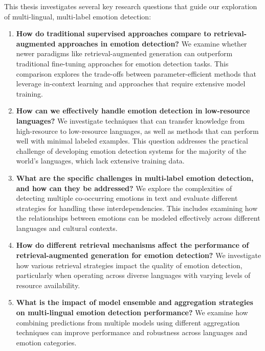 \documentclass[a4paper,12pt]{extarticle}
\begin{document}
This thesis investigates several key research questions that guide our exploration of multi-lingual, multi-label emotion detection:

\begin{enumerate}
\item \textbf{How do traditional supervised approaches compare to retrieval-augmented approaches in emotion detection?}
   We examine whether newer paradigms like retrieval-augmented generation can outperform traditional fine-tuning approaches for emotion detection tasks. This comparison explores the trade-offs between parameter-efficient methods that leverage in-context learning and approaches that require extensive model training.

\item \textbf{How can we effectively handle emotion detection in low-resource languages?}
   We investigate techniques that can transfer knowledge from high-resource to low-resource languages, as well as methods that can perform well with minimal labeled examples. This question addresses the practical challenge of developing emotion detection systems for the majority of the world's languages, which lack extensive training data.

\item \textbf{What are the specific challenges in multi-label emotion detection, and how can they be addressed?}
   We explore the complexities of detecting multiple co-occurring emotions in text and evaluate different strategies for handling these interdependencies. This includes examining how the relationships between emotions can be modeled effectively across different languages and cultural contexts.

\item \textbf{How do different retrieval mechanisms affect the performance of retrieval-augmented generation for emotion detection?}
   We investigate how various retrieval strategies impact the quality of emotion detection, particularly when operating across diverse languages with varying levels of resource availability.

\item \textbf{What is the impact of model ensemble and aggregation strategies on multi-lingual emotion detection performance?}
   We examine how combining predictions from multiple models using different aggregation techniques can improve performance and robustness across languages and emotion categories.
\end{enumerate}
\end{document}
